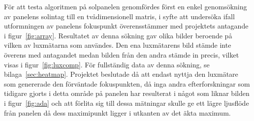             För att testa algoritmen på solpanelen genomfördes först en enkel genomsökning av panelens solintag till en tvådimensionell matris, i syfte att undersöka ifall utformningen av panelens fokuspunkt överensstämmer med projektets antagande i figur~\ref{fig:array}. Resultatet av denna sökning gav olika bilder beroende på vilken av luxmätarna som användes. Den ena luxmätarens bild stämde inte överens med antagandet medan bilden från den andra stämde in precis, vilket visas i figur~\ref{fig:luxcomp}.
            För fullständig data av denna sökning, se bilaga~\ref{sec:heatmap}. Projektet beslutade då att endast nyttja den luxmätare som genererade den förväntade fokuspunkten, då inga andra efterforskningar som tidigare gjorts i detta område på panelen har resulterat i något som liknar bilden i figur~\ref{fig:ada} och att förlita sig till dessa mätningar skulle ge ett lägre ljusflöde från panelen då dess maximipunkt ligger i utkanten av det äkta maximum.




